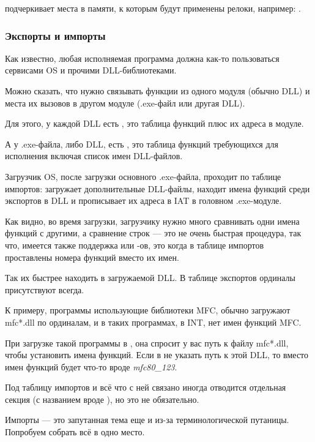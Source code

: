 \myindex{\olly}
\olly подчеркивает места в памяти, к которым будут применены релоки, например: .

\subsubsection{Экспорты и импорты}

\label{PE_exports_imports}
Как известно, любая исполняемая программа должна как-то пользоваться сервисами \ac{OS} и прочими DLL-библиотеками.

Можно сказать, что нужно связывать функции из одного модуля (обычно DLL) и места их вызовов в другом модуле (.exe-файл или другая DLL).

Для этого, у каждой DLL есть , это таблица функций плюс их адреса в модуле.

А у .exe-файла, либо DLL, есть , это таблица функций требующихся для исполнения
включая список имен DLL-файлов.

Загрузчик \ac{OS}, после загрузки основного .exe-файла, проходит по таблице импортов:
загружает дополнительные DLL-файлы, 
находит имена функций среди экспортов в DLL и прописывает их адреса в \ac{IAT} в головном .exe-модуле.

Как видно, во время загрузки, загрузчику нужно много сравнивать одни имена функций с другими,
а сравнение строк --- это не очень быстрая процедура, так что,
имеется также поддержка  или
-ов, это когда в таблице импортов проставлены номера функций вместо их имен.

Так их быстрее находить в загружаемой DLL.
В таблице экспортов ординалы присутствуют всегда.

К примеру, программы использующие библиотеки \ac{MFC}, обычно загружают mfc*.dll по ординалам, и в таких программах, в \ac{INT}, нет имен функций \ac{MFC}.

При загрузке такой программы в \IDA, она спросит у вас путь к файлу mfc*.dll,
чтобы установить имена функций.
Если в \IDA не указать путь к этой DLL, то вместо имен функций будет что-то вроде \emph{mfc80\_123}.


Под таблицу импортов и всё что с ней связано иногда отводится отдельная секция 
(с названием вроде ),
но это не обязательно.

Импорты --- это запутанная тема еще и из-за терминологической путаницы. Попробуем собрать всё в одно место.

